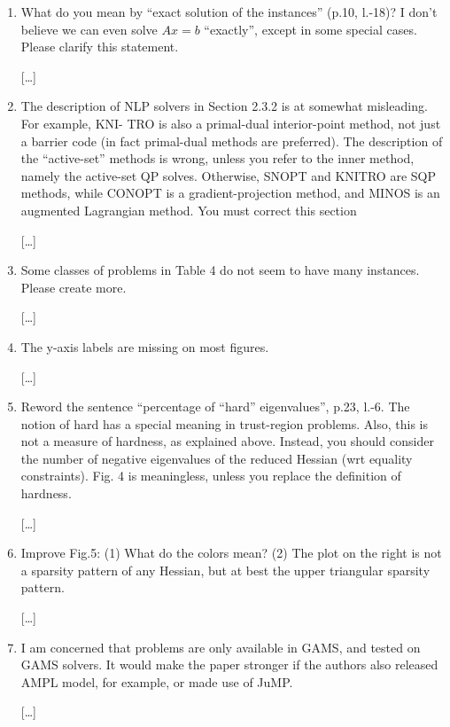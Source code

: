 \documentclass[11pt]{article}
\newcommand{\rep}[1]{{\textcolor{acblue}{#1}}}
\begin{document}
{\begin{enumerate}
\rep{[\dots] }


\item What do you mean by ``exact solution of the instances'' (p.10, l.-18)? I don’t believe we can even
solve $Ax = b$ ``exactly'', except in some special cases. Please clarify this statement.

\rep{[\dots] }


\item The description of NLP solvers in Section 2.3.2 is at somewhat misleading. For example, KNI-
TRO is also a primal-dual interior-point method, not just a barrier code (in fact primal-dual
methods are preferred). The description of the “active-set” methods is wrong, unless you refer
to the inner method, namely the active-set QP solves. Otherwise, SNOPT and KNITRO are
SQP methods, while CONOPT is a gradient-projection method, and MINOS is an augmented
Lagrangian method. You must correct this section

\rep{[\dots] }


\item Some classes of problems in Table 4 do not seem to have many instances. Please create more.

\rep{[\dots] }


\item The y-axis labels are missing on most figures.

\rep{[\dots] }


\item Reword the sentence ``percentage of ``hard'' eigenvalues'', p.23, l.-6. The notion of hard has a
special meaning in trust-region problems. Also, this is not a measure of hardness, as explained
above. Instead, you should consider the number of negative eigenvalues of the reduced Hessian
(wrt equality constraints). Fig. 4 is meaningless, unless you replace the definition of hardness.

\rep{[\dots] }


\item Improve Fig.5: (1) What do the colors mean? (2) The plot on the right is not a sparsity pattern
of any Hessian, but at best the upper triangular sparsity pattern.

\rep{[\dots] }


\item I am concerned that problems are only available in GAMS, and tested on GAMS solvers. It would make the paper stronger if the authors also released AMPL model, for example, or made use of
JuMP.

\rep{[\dots] }

\end{enumerate}

}
\end{document}
